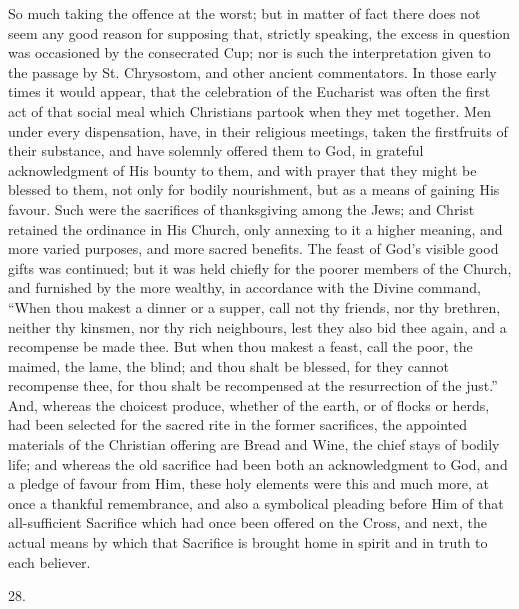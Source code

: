 So much taking the offence at the worst; but in
matter of fact there does not seem any good reason for supposing that,
strictly speaking, the excess in question was occasioned by the
consecrated Cup; nor is such the interpretation given to the passage
by St. Chrysostom, and other ancient commentators. In those early
times it would appear, that the celebration of the Eucharist was often
the first act of that social meal which Christians partook when they
met together. Men under every dispensation, have, in their religious
meetings, taken the firstfruits of their substance, and have solemnly
offered them to God, in grateful acknowledgment of His bounty to them,
and with prayer that they might be blessed to them, not only for
bodily nourishment, but as a means of gaining His favour. Such were
the sacrifices of thanksgiving among the Jews; and Christ retained the
ordinance in His Church, only annexing to it a higher meaning, and
more varied purposes, and more sacred benefits. The feast of God's
visible good gifts was continued; but it was held chiefly for the
poorer members of the Church, and furnished by the more wealthy, in
accordance with the Divine command, ``When thou makest a dinner or a
supper, call not thy friends, nor thy brethren, neither thy kinsmen,
nor thy rich neighbours, lest they also bid thee again, and a
recompense be made thee. But when thou makest a feast, call the poor,
the maimed, the lame, the blind; and thou shalt be blessed, for they
cannot recompense thee, for thou shalt be recompensed at the
resurrection of the just.'' And, whereas the choicest produce, whether
of the earth, or of flocks or herds, had been selected for the sacred
rite in the former sacrifices, the appointed materials of the
Christian offering are Bread and Wine, the chief stays of bodily life;
and whereas the old sacrifice had been both an acknowledgment to God,
and a pledge of favour from Him, these holy elements were this and
much more, at once a thankful remembrance, and also a symbolical
pleading before Him of that all-sufficient Sacrifice which had once
been offered on the Cross, and next, the actual means by which that
Sacrifice is brought home in spirit and in truth to each believer.

28.

